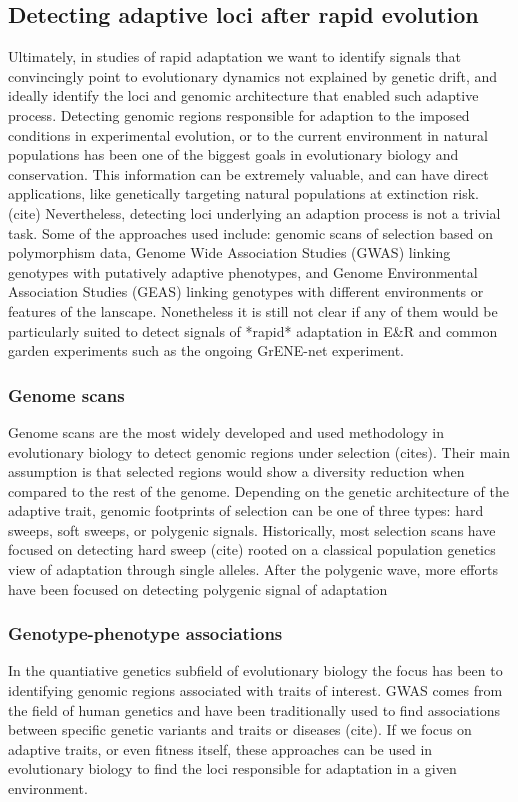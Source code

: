 \documentclass{article}
\begin{document}
\subsection{Detecting adaptive loci after rapid evolution}

Ultimately, in studies of rapid adaptation we want to identify signals that convincingly point to evolutionary dynamics not explained by genetic drift, and ideally identify the loci and genomic architecture that enabled such adaptive process. Detecting genomic regions responsible for adaption to the imposed conditions in experimental evolution, or to the current environment in natural populations has been one of the biggest goals in evolutionary biology and conservation. This information can be extremely valuable, and can have direct applications, like genetically targeting natural populations at extinction risk. (cite) Nevertheless, detecting loci underlying an adaption process is not a trivial task. Some of the approaches used include: genomic scans of selection based on polymorphism data, Genome Wide Association Studies (GWAS) linking genotypes with putatively adaptive phenotypes, and Genome Environmental Association Studies (GEAS) linking genotypes with different environments or features of the lanscape. Nonetheless it is still not clear if any of them would be particularly suited to detect signals of *rapid* adaptation in E\&R and common garden experiments such as the ongoing GrENE-net experiment.

\subsubsection{Genome scans}
Genome scans are the most widely developed and used methodology in evolutionary biology to detect genomic regions under selection (cites). Their main assumption is that selected regions would show a diversity reduction when compared to the rest of the genome. Depending on the genetic architecture of the adaptive trait,  genomic footprints of selection can be one of three types: hard sweeps, soft sweeps, or polygenic signals. Historically, most selection scans have focused on detecting hard sweep (cite) rooted on a classical population genetics view of adaptation through single alleles. After the polygenic wave, more efforts have been focused on detecting polygenic signal of adaptation \citep{Berg2014-zl, Sella2019-km, Barghi2020-aa,Stephan2016-tx}  

\subsubsection{Genotype-phenotype associations} 
In the quantiative genetics subfield of evolutionary biology the focus has been to identifying genomic regions associated with traits of interest. GWAS comes from the field of human genetics and have been traditionally used to find associations between specific genetic variants and traits or diseases (cite). If we focus on adaptive traits, or even fitness itself, these approaches can be used in evolutionary biology to find the loci responsible for adaptation in a given environment. 
\end{document}
